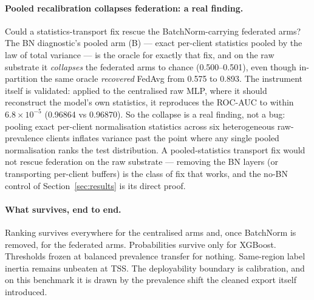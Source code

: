 \paragraph{Pooled recalibration collapses federation: a real
finding.}
Could a statistics-transport fix rescue the BatchNorm-carrying
federated arms? The BN diagnostic's pooled arm (B) --- exact
per-client statistics pooled by the law of total variance --- is the
oracle for exactly that fix, and on the raw substrate it
\emph{collapses} the federated arms to chance (0.500--0.501), even
though in-partition the same oracle \emph{recovered} FedAvg from
0.575 to 0.893. The instrument itself is validated: applied to the
centralised raw MLP, where it should reconstruct the model's own
statistics, it reproduces the ROC-AUC to within $6.8\times10^{-5}$
(0.96864 vs 0.96870). So the collapse is a real finding, not a bug:
pooling exact per-client normalisation statistics across six
heterogeneous raw-prevalence clients inflates variance past the
point where any single pooled normalisation ranks the test
distribution. A pooled-statistics transport fix would not rescue
federation on the raw substrate --- removing the BN layers (or
transporting per-client buffers) is the class of fix that works,
and the no-BN control of Section~\ref{sec:results} is its direct
proof.

\paragraph{What survives, end to end.}
Ranking survives everywhere for the centralised arms and, once
BatchNorm is removed, for the federated arms. Probabilities survive
only for XGBoost. Thresholds frozen at balanced prevalence transfer
for nothing. Same-region label inertia remains unbeaten at TSS.
The deployability boundary is calibration, and on this benchmark it
is drawn by the prevalence shift the cleaned export itself
introduced.
